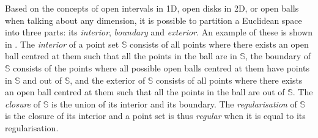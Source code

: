 Based on the concepts of open intervals in 1D, open disks in 2D, or open balls when talking about any dimension, it is possible to partition a Euclidean space into three parts: its \emph{interior}, \emph{boundary} and \emph{exterior}.
An example of these is shown in .
The \emph{interior} of a point set $\mathbb{S}$ consists of all points where there exists an open ball centred at them such that all the points in the ball are in $\mathbb{S}$, the boundary of $\mathbb{S}$ consists of the points where all possible open balls centred at them have points in $\mathbb{S}$ and out of $\mathbb{S}$, and the exterior of $\mathbb{S}$ consists of all points where there exists an open ball centred at them such that all the points in the ball are out of $\mathbb{S}$.
The \emph{closure} of $\mathbb{S}$ is the union of its interior and its boundary.
The \emph{regularisation} of $\mathbb{S}$ is the closure of its interior and a point set is thus \emph{regular} when it is equal to its regularisation.

